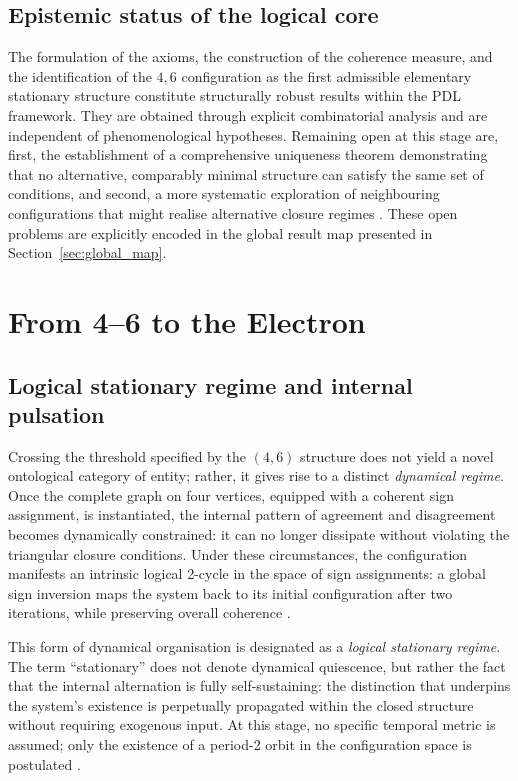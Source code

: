 \documentclass[11pt,a4paper]{article}
\begin{document}
\subsection{Epistemic status of the logical core}
\label{subsec:logical_status}

The formulation of the axioms, the construction of the coherence measure, and the identification of the \(4,6\) configuration as the first admissible elementary stationary structure constitute structurally robust results within the PDL framework. They are obtained through explicit combinatorial analysis and are independent of phenomenological hypotheses. Remaining open at this stage are, first, the establishment of a comprehensive uniqueness theorem demonstrating that no alternative, comparably minimal structure can satisfy the same set of conditions, and second, a more systematic exploration of neighbouring configurations that might realise alternative closure regimes \citep{PDL_position}. These open problems are explicitly encoded in the global result map presented in Section~\ref{sec:global_map}.

\section{From 4--6 to the Electron}
\label{sec:four_six_electron}

\subsection{Logical stationary regime and internal pulsation}
\label{subsec:logical_stationary}

Crossing the threshold specified by the \((4,6)\) structure does not yield a novel ontological category of entity; rather, it gives rise to a distinct \emph{dynamical regime}. Once the complete graph on four vertices, equipped with a coherent sign assignment, is instantiated, the internal pattern of agreement and disagreement becomes dynamically constrained: it can no longer dissipate without violating the triangular closure conditions. Under these circumstances, the configuration manifests an intrinsic logical 2-cycle in the space of sign assignments: a global sign inversion maps the system back to its initial configuration after two iterations, while preserving overall coherence
\citep{PDL_Main_2026,PDL_intro}.

This form of dynamical organisation is designated as a \emph{logical stationary regime}. The term “stationary” does not denote dynamical quiescence, but rather the fact that the internal alternation is fully self-sustaining: the distinction that underpins the system’s existence is perpetually propagated within the closed structure without requiring exogenous input. At this stage, no specific temporal metric is assumed; only the existence of a period-2 orbit in the configuration space is postulated
\citep{PDL_Main_2026,PDL_position}.
\end{document}
